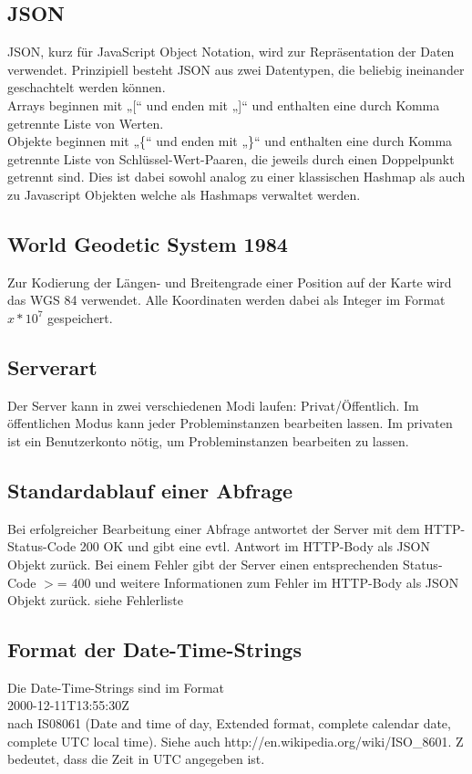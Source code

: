 \documentclass[ngerman,titlepage,parskip=true]{scrartcl}
\begin{document}
	\subsection{JSON}
	 
	JSON, kurz für JavaScript Object Notation, wird zur Repräsentation der Daten verwendet.
	Prinzipiell besteht JSON aus zwei Datentypen, die beliebig ineinander geschachtelt werden können. \\
	Arrays beginnen mit „[“ und enden mit „]“ und enthalten eine durch Komma getrennte Liste von Werten. \\
	Objekte beginnen mit „\{“ und enden mit „\}“ und enthalten eine durch Komma getrennte Liste von Schlüssel-Wert-Paaren, die jeweils durch einen Doppelpunkt getrennt sind.
	Dies ist dabei sowohl analog zu einer klassischen Hashmap als auch zu Javascript Objekten welche als Hashmaps verwaltet werden.
	
	\subsection{World Geodetic System 1984}
	
	Zur Kodierung der Längen- und Breitengrade einer Position auf der Karte wird das WGS 84 verwendet. Alle Koordinaten werden dabei als Integer im Format $x*10^7$ gespeichert.
	
	\subsection*{Serverart}
	Der Server kann in zwei verschiedenen Modi laufen: Privat/Öffentlich. Im öffentlichen Modus kann jeder Probleminstanzen bearbeiten lassen. Im privaten ist ein Benutzerkonto nötig, um Probleminstanzen bearbeiten zu lassen.
	
	\subsection{Standardablauf einer Abfrage}
	Bei erfolgreicher Bearbeitung einer Abfrage antwortet der Server mit dem HTTP-Status-Code 200 OK und gibt eine evtl. Antwort im HTTP-Body als JSON Objekt zurück. Bei einem Fehler gibt der Server einen entsprechenden Status-Code $>$= 400 und weitere Informationen zum Fehler im HTTP-Body als JSON Objekt zurück. siehe Fehlerliste %
	
	\subsection{Format der Date-Time-Strings}
	Die Date-Time-Strings sind im Format\\
	2000-12-11T13:55:30Z\\
	nach IS08061 (Date and time of day, Extended format, complete calendar date, complete UTC local time). Siehe auch http://en.wikipedia.org/wiki/ISO{\_}8601. Z bedeutet, dass die Zeit in UTC angegeben ist.	
\end{document}

